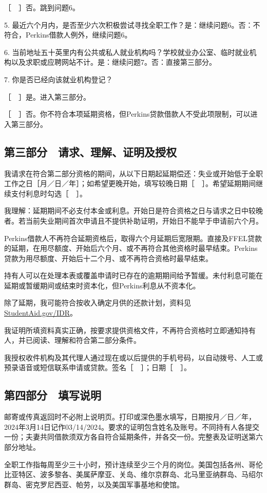 \documentclass[UTF8,fontset=none,11pt,a4paper]{ctexart}
\begin{document}
［　］否。跳到问题6。


5. 最近六个月内，是否至少六次积极尝试寻找全职工作？是：继续问题6。否：不符合，Perkins借款人例外，继续问题6。


6. 当前地址五十英里内有公共或私人就业机构吗？学校就业办公室、临时就业机构以及求职或应聘网站不计。是：继续问题7。否：直接第三部分。


7. 你是否已经向该就业机构登记？


［　］是。进入第三部分。


［　］否。你不符合本项延期资格，但Perkins贷款借款人不受此项限制，可以进入第三部分。


\subsection*{第三部分　请求、理解、证明及授权}
我请求在符合第二部分资格的期间，从以下日期起延期偿还：失业或开始低于全职工作之日［月／日／年］；如希望更晚开始，填写较晚日期［　］。希望延期期间继续支付利息时勾选［　］。


我理解：延期期间不必支付本金或利息。开始日是符合资格之日与请求之日中较晚者。若当前失业期间首次申请且不提供补助证明，开始日不能早于申请前六个月。


Perkins借款人不再符合延期资格后，取得六个月延期后宽限期。直接及FFEL贷款的延期，在用尽额度、开始后六个月、或不再符合其他资格时最早结束。Perkins贷款为用尽额度、开始后十二个月、或不再符合资格时最早结束。


持有人可以在处理本表或覆盖申请时已存在的逾期期间给予暂缓。未付利息可能在延期或暂缓期间或结束时资本化，但Perkins利息从不资本化。


除了延期，我可能符合按收入确定月供的还款计划，资料见\url{StudentAid.gov/IDR}。


我证明所填资料真实正确，按要求提供资格文件，不再符合资格时立即通知持有人，并已阅读、理解和符合第二部分条件。


我授权收件机构及其代理人通过现在或以后提供的手机号码，以自动拨号、人工或预录语音或短信联系申请或贷款。签名［　］；日期［　］。


\subsection*{第四部分　填写说明}
邮寄或传真返回时不必附上说明页。打印或深色墨水填写，日期按月／日／年，2024年3月14日记作03/14/2024。要求的证明包含姓名及账号。不同持有人各提交一份；夫妻共同借款须双方各自符合延期条件，并各交一份。完整表及证明送第六部分地址。


全职工作指每周至少三十小时，预计连续至少三个月的岗位。美国包括各州、哥伦比亚特区、波多黎各、美属萨摩亚、关岛、维尔京群岛、北马里亚纳群岛、马绍尔群岛、密克罗尼西亚、帕劳，以及美国军事基地和使馆。
\end{document}
